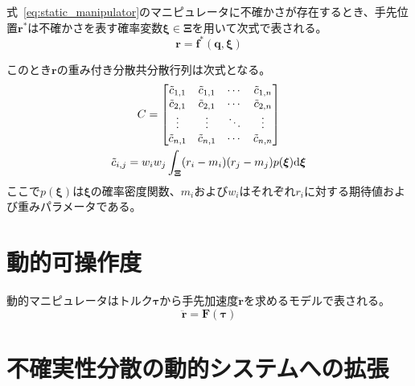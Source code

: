 \documentclass[10pt,a4j,twocolumn]{ltjsarticle}
\begin{document}
式~\eqref{eq:static_manipulator}のマニピュレータに不確かさが存在するとき、手先位置$\bm{r}^{*}$は不確かさを表す確率変数$\bm{\xi} \in \bm{\Xi}$を用いて次式で表される。
\begin{equation}
  \bm{r} = \bm{f}^{*}(\bm{q}, \bm{\xi})
\end{equation}

このとき$\bm{r}$の重み付き分散共分散行列は次式となる。
\begin{gather}
  C = \begin{bmatrix}
        \tilde{c}_{1, 1} & \tilde{c}_{1, 1} & \cdots & \tilde{c}_{1, n} \\
        \tilde{c}_{2, 1} & \tilde{c}_{2, 1} & \cdots & \tilde{c}_{2, n} \\
        \vdots           & \vdots           & \ddots & \vdots           \\
        \tilde{c}_{n, 1} & \tilde{c}_{n, 1} & \cdots & \tilde{c}_{n, n} \\
      \end{bmatrix} \\
  \tilde{c}_{i, j} = w_{i} w_{j} \int_{\bm{\Xi}} (r_{i} - m_{i})(r_{j} - m_{j}) p(\bm{\xi}) \mathrm{d}\bm{\xi} \notag
\end{gather}
ここで$p(\bm{\xi})$は$\bm{\xi}$の確率密度関数、$m_{i}$および$w_{i}$はそれぞれ$r_{i}$に対する期待値および重みパラメータである。


\section{動的可操作度}

動的マニピュレータはトルク$\bm{\tau}$から手先加速度$\ddot{\bm{r}}$を求めるモデルで表される。
\begin{equation}
  \ddot{\bm{r}} = \bm{F}(\bm{\tau})
\end{equation}


\section{不確実性分散の動的システムへの拡張}
\end{document}
